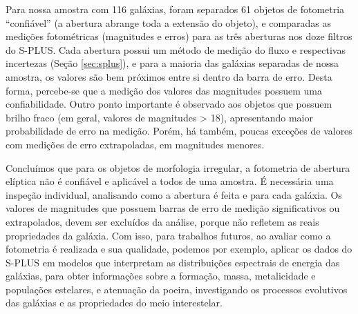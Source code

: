 Para nossa amostra com 116 galáxias, foram separados 61 objetos de fotometria ``confiável'' (a abertura abrange toda a extensão do objeto), e comparadas as medições fotométricas (magnitudes e erros) para as três aberturas nos doze filtros do S-PLUS. Cada abertura possui um método de medição do fluxo e respectivas incertezas (Seção \ref{sec:splus}), e para a maioria das galáxias separadas de nossa amostra, os valores são bem próximos entre si dentro da barra de erro. Desta forma, percebe-se que a medição dos valores das magnitudes possuem uma confiabilidade. Outro ponto importante é observado aos objetos que possuem brilho fraco (em geral, valores de magnitudes > 18), apresentando maior probabilidade de erro na medição. Porém, há também, poucas exceções de valores com medições de erro extrapoladas, em magnitudes menores. 

Concluímos que para os objetos de morfologia irregular, a fotometria de abertura elíptica não é confiável e aplicável a todos de uma amostra. É necessária uma inspeção individual, analisando como a abertura é feita e para cada galáxia. Os valores de magnitudes que possuem barras de erro de medição significativos ou extrapolados, devem ser excluídos da análise, porque não refletem as reais propriedades da galáxia. Com isso, para trabalhos futuros, ao avaliar como a fotometria é realizada e sua qualidade, podemos por exemplo, aplicar os dados do S-PLUS em modelos que interpretam as distribuições espectrais de energia das galáxias, para obter informações sobre a formação, massa, metalicidade e populações estelares, e atenuação da poeira, investigando os processos evolutivos das galáxias e as propriedades do meio interestelar.


